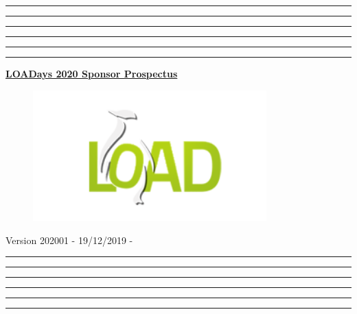 \documentclass[a4paper,12pt]{article}
\begin{document}
\makeatletter
\renewcommand{\maketitle}{
    \begin{titlepage}
        \thispagestyle{empty}
        \pagenumbering{empty}
        \begin{center}
            \hrule\hrule\hrule\hrule\hrule\hrule
            \vspace{2.5cm}
            \Large{\underline{\textbf{LOADays 2020 Sponsor Prospectus}}}\\
        \end{center}
        \begin{figure}[h!]
            \centering
            \includegraphics[width=9cm]{images/loadays.png}
        \end{figure}
        \begin{center}
            \vspace{3.5cm}
            \scriptsize{Version 202001 - 19/12/2019 - \gitAbbrevHash{}}
            \hrule\hrule\hrule\hrule\hrule\hrule
        \end{center}
    \end{titlepage}
}
\maketitle

\pagestyle{fancy}
\setcounter{page}{1}
\fancyhead{}
\fancyhead[C]{}
\fancyfoot{}
\fancyfoot[C]{\bfseries\thepage}

%
\def\confdates{28th and 29th March 2020}

%

\end{document}
